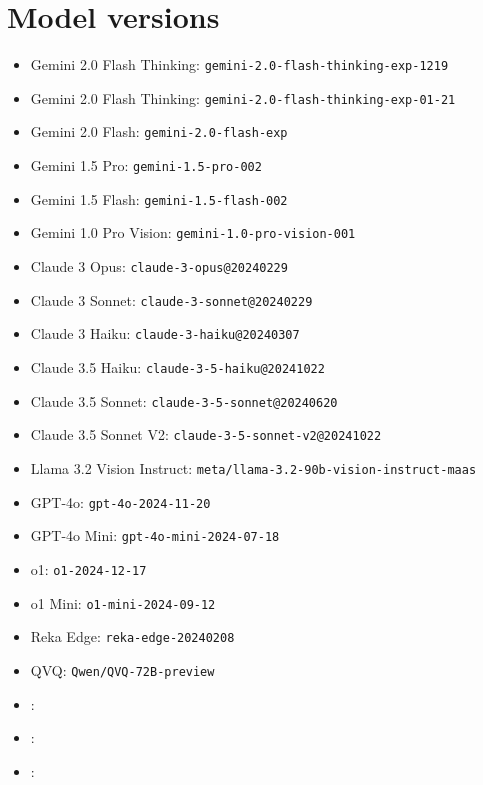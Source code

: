 \section{Model versions}
\label{app:model_versions}

\begin{itemize}
    \item Gemini 2.0 Flash Thinking: \texttt{gemini-2.0-flash-thinking-exp-1219}
    \item Gemini 2.0 Flash Thinking: \texttt{gemini-2.0-flash-thinking-exp-01-21}
    \item Gemini 2.0 Flash: \texttt{gemini-2.0-flash-exp}
    \item Gemini 1.5 Pro: \texttt{gemini-1.5-pro-002}
    \item Gemini 1.5 Flash: \texttt{gemini-1.5-flash-002}
    \item Gemini 1.0 Pro Vision: \texttt{gemini-1.0-pro-vision-001}
    \item Claude 3 Opus: \texttt{claude-3-opus@20240229}
    \item Claude 3 Sonnet: \texttt{claude-3-sonnet@20240229}
    \item Claude 3 Haiku: \texttt{claude-3-haiku@20240307}
    \item Claude 3.5 Haiku: \texttt{claude-3-5-haiku@20241022}
    \item Claude 3.5 Sonnet: \texttt{claude-3-5-sonnet@20240620}
    \item Claude 3.5 Sonnet V2: \texttt{claude-3-5-sonnet-v2@20241022}
    \item Llama 3.2 Vision Instruct: \texttt{meta/llama-3.2-90b-vision-instruct-maas}
    \item GPT-4o: \texttt{gpt-4o-2024-11-20}
    \item GPT-4o Mini: \texttt{gpt-4o-mini-2024-07-18}
    \item o1: \texttt{o1-2024-12-17}
    \item o1 Mini: \texttt{o1-mini-2024-09-12}
    \item Reka Edge: \texttt{reka-edge-20240208}
    \item QVQ: \texttt{Qwen/QVQ-72B-preview}

    \item \QwenShort: \QwenFull 
    \item \NVLMShort: \NVLMFull
    \item \PixtralShort: \PixtralFull
\end{itemize}



